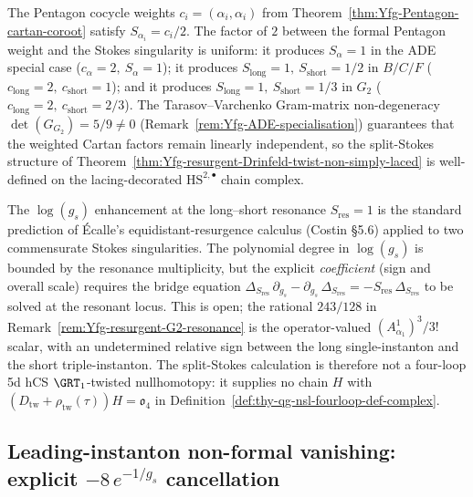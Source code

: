 \begin{remark}
\label{rem:Yfg-resurgent-pentagon-stokes-bridge}
The Pentagon cocycle weights $c_i = (\alpha_i, \alpha_i)$ from
Theorem~\ref{thm:Yfg-Pentagon-cartan-coroot} satisfy
$S_{\alpha_i} = c_i / 2$. The factor of $2$ between the formal
Pentagon weight and the Stokes singularity is uniform: it produces
$S_{\alpha} = 1$ in the ADE special case
\textup{(}$c_\alpha = 2,\ S_\alpha = 1$\textup{);} it produces
$S_{\mathrm{long}} = 1,\ S_{\mathrm{short}} = 1/2$ in $B/C/F$
\textup{(}$c_{\mathrm{long}} = 2,\ c_{\mathrm{short}} = 1$\textup{);}
and it produces $S_{\mathrm{long}} = 1,\ S_{\mathrm{short}} = 1/3$ in
$G_2$ \textup{(}$c_{\mathrm{long}} = 2,\ c_{\mathrm{short}} = 2/3$\textup{).}
The Tarasov--Varchenko Gram-matrix non-degeneracy
$\det(G_{G_2}) = 5/9 \neq 0$
\textup{(}Remark~\ref{rem:Yfg-ADE-specialisation}\textup{)} guarantees
that the weighted Cartan factors remain linearly independent, so the
split-Stokes structure of
Theorem~\ref{thm:Yfg-resurgent-Drinfeld-twist-non-simply-laced}
is well-defined on the lacing-decorated $\mathrm{HS}^{2, \bullet}$
chain complex.
\end{remark}

\begin{remark}
\label{rem:Yfg-resurgent-resonance-conditional}
The $\log(g_s)$ enhancement at the long--short resonance
$S_{\mathrm{res}} = 1$ is the standard prediction of Écalle's
equidistant-resurgence calculus \textup{(}Costin §5.6\textup{)}
applied to two commensurate Stokes singularities. The polynomial
degree in $\log(g_s)$ is bounded by the resonance multiplicity, but
the explicit \emph{coefficient} \textup{(}sign and overall
scale\textup{)} requires the bridge equation
$\Delta_{S_{\mathrm{res}}}\,\partial_{g_s} - \partial_{g_s}\,
\Delta_{S_{\mathrm{res}}} = -S_{\mathrm{res}}\,
\Delta_{S_{\mathrm{res}}}$
to be solved at the resonant locus. This is open; the rational
$243/128$ in
Remark~\ref{rem:Yfg-resurgent-G2-resonance} is the operator-valued
$(A^1_{\alpha_1})^3 / 3!$ scalar, with an undetermined relative sign
between the long single-instanton and the short triple-instanton.
The split-Stokes calculation is therefore not a four-loop 5d hCS
$\GRT_1$-twisted nullhomotopy: it supplies no chain $H$ with
$(D_{\mathrm{tw}}+\rho_{\mathrm{tw}}(\tau))H=\mathfrak o_4$ in
Definition~\ref{def:thy-qg-nsl-fourloop-def-complex}.
\end{remark}

\subsection{Leading-instanton non-formal vanishing: explicit
 \texorpdfstring{$-8\, e^{-1/g_s}$}{-8 e--1/g-s} cancellation}
\label{subsec:Yfg-non-formal-leading-vanishing}

